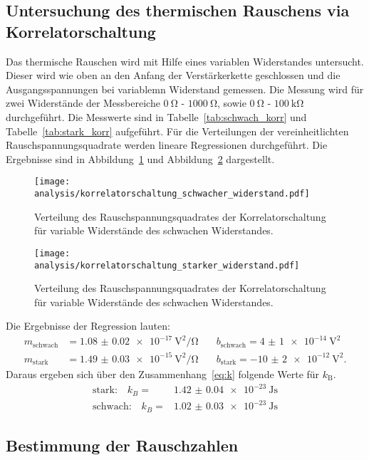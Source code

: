 \subsection{Untersuchung des thermischen Rauschens via Korrelatorschaltung}
%
Das thermische Rauschen wird mit Hilfe eines variablen Widerstandes untersucht. Dieser wird wie oben an den Anfang der Verstärkerkette geschlossen und die Ausgangsspannungen bei variablemn Widerstand gemessen. Die Messung wird für zwei Widerstände der Messbereiche $\SI{0}{\ohm}$ - $\SI{1000}{\ohm}$, sowie $\SI{0}{\ohm}$ - $\SI{100}{\kilo\ohm}$ durchgeführt. Die Messwerte sind in Tabelle~\ref{tab:schwach_korr} und Tabelle~\ref{tab:stark_korr} aufgeführt.
Für die Verteilungen der vereinheitlichten Rauschspannungsquadrate werden lineare Regressionen durchgeführt. Die Ergebnisse sind in Abbildung~\ref{fig:korr_schwach} und Abbildung~\ref{fig:korr_stark} dargestellt.
%
\begin{figure}
  \centering
  \texttt{[image: analysis/korrelatorschaltung\_schwacher\_widerstand.pdf]}
  \caption{Verteilung des Rauschspannungsquadrates der Korrelatorschaltung für variable Widerstände des schwachen Widerstandes.}
  \label{fig:korr_schwach}
\end{figure}
%
\begin{figure}
  \centering
  \texttt{[image: analysis/korrelatorschaltung\_starker\_widerstand.pdf]}
  \caption{Verteilung des Rauschspannungsquadrates der Korrelatorschaltung für variable Widerstände des schwachen Widerstandes.}
  \label{fig:korr_stark}
\end{figure}
%
Die Ergebnisse der Regression lauten:
%
\begin{align*}
  m_\text{schwach}&=\SI{1.08(2)e-17}{\volt\squared\per\ohm} \quad &b_\text{schwach}=\SI{4(1)e-14}{\volt\squared} \\ m_\text{stark}&=\SI{1.49(3)e-15}{\volt\squared\per\ohm} \quad &b_\text{stark}=\SI{-10(2)e-12}{\volt\squared}.
\end{align*}
%
Daraus ergeben sich über den Zusammenhang~\ref{eq:k} folgende Werte für $k_\text{B}$.
%
\begin{align}
  \text{stark:}\quad k_{B}=&\SI{1.42(4)e-23}{\joule\second} \\
  \text{schwach:}\quad k_{B}=&\SI{1.02(3)e-23}{\joule\second}
\end{align}
%
\subsection{Bestimmung der Rauschzahlen}

